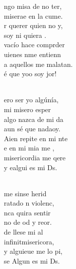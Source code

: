 \documentclass[12pt]{article}
\begin{document}
\begin{multicols*}{2}
\begin{cancion}%
	ngo misa de no ter,\\
	 miserae en la cume.\\
	r querer  quien no y,\\
	soy ni quiera .\\
\jump
	 vacío hace comprder\\
	uienes nme entienn\\
	a aquellos  me malatan.\\
	é que yoo soy jor!\\\jump\\
	\begin{chorus}%
	ero ser yo algúnía,\\
	 mi misero esper\\
	 algo nazca de mi da\\
	aun sé que nadaoy.\\
\jump
	Aien repite en mi nte\\
	e en mi mia me ,\\
	 misericordia me qere\\
	y ealgui es mi Ds.\\
	\end{chorus}%
	\jump\\
	 me sinse herid\\
	ratado n violenc,\\
	nca quira sentir\\
	no de od y reor.\\
\jump
	 de llese mi al\\
	infinitmisericora,\\
	y alguieue me lo pi,\\
	se Algun es mi Ds.\\
\end{cancion}%


\end{multicols*}
\end{document}
